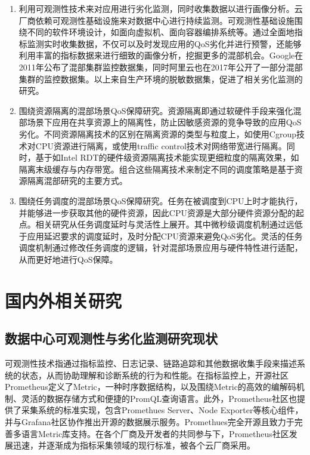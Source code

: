 \begin{enumerate}
    \item 利用可观测性技术来对应用进行劣化监测，同时收集数据以进行画像分析。云厂商依赖可观测性基础设施来对数据中心进行持续监测。可观测性基础设施围绕不同的软件环境设计，如面向虚拟机、面向容器编排系统等。通过全面地指标监测实时收集数据，不仅可以及时发现应用的QoS劣化并进行预警，还能够利用丰富的指标数据来进行细致的画像分析，挖掘更多的混部机会。Google在2011年公布了混部集群监控数据集，同时阿里云也在2017年公开了一部分混部集群的监控数据集\citep{guo2019limits}。以上来自生产环境的脱敏数据集，促进了相关劣化监测的研究。
    \item 围绕资源隔离的混部场景QoS保障研究。资源隔离即通过软硬件手段来强化混部场景下应用在共享资源上的隔离性，防止因敏感资源的竞争导致的应用QoS劣化。不同资源隔离技术的区别在隔离资源的类型与粒度上，如使用Cgroup技术对CPU资源进行隔离，或使用traffic control技术\citep{hubert2002linux}对网络带宽进行隔离。同时，基于如Intel RDT\citep{guide2011intel}的硬件级资源隔离技术能实现更细粒度的隔离效果，如隔离末级缓存与内存带宽。组合这些隔离技术来制定不同的调度策略是基于资源隔离混部研究的主要方式。
    \item 围绕任务调度的混部场景QoS保障研究。任务在被调度到CPU上时才能执行，并能够进一步获取其他的硬件资源，因此CPU资源是大部分硬件资源分配的起点。相关研究从任务调度延时与灵活性上展开。其中微秒级调度机制通过远低于应用延迟要求的调度延时，及时分配CPU资源来避免QoS劣化。灵活的任务调度机制通过修改任务调度的逻辑，针对混部场景应用与硬件特性进行适配，从而更好地进行QoS保障。
\end{enumerate}

\section{国内外相关研究}

\subsection{数据中心可观测性与劣化监测研究现状}


可观测性技术指通过指标监控、日志记录、链路追踪和其他数据收集手段来描述系统的状态，从而协助理解和诊断系统的行为和性能。在指标监控上，开源社区Prometheus\citep{brazil2018prometheus}定义了Metric，一种时序数据结构，以及围绕Metric的高效的编解码机制、灵活的数据存储方式和便捷的PromQL查询语言。此外，Prometheus社区也提供了采集系统的标准实现，包含Promethues Server、Node Exporter等核心组件，并与Grafana社区协作推出开源的数据展示服务。Promethues完全开源且致力于完善多语言Metric库支持。在各个厂商及开发者的共同参与下，Prometheus社区发展迅速，并逐渐成为指标采集领域的现行标准，被各个云厂商采用。

